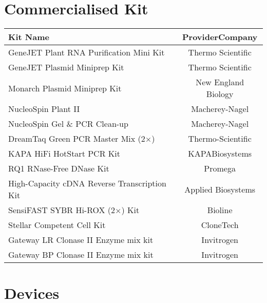 \section{Commercialised Kit}
\begin{longtable}[h]{|l|c|}
	\hline
	\textsf{\textbf{Kit Name}} & \textsf{\textbf{Provider\textfractionsolidus Company}} \\
	\hline
	GeneJET Plant RNA Purification Mini Kit & Thermo Scientific \\
	\hline
	GeneJET Plasmid Miniprep Kit & Thermo Scientific \\
	\hline
	Monarch Plasmid Miniprep Kit & New England Biology \\
	\hline
	NucleoSpin Plant II & Macherey-Nagel \\
	\hline
	NucleoSpin Gel \& PCR Clean-up & Macherey-Nagel \\
	\hline
	DreamTaq Green PCR Master Mix (2$\times$)  & Thermo-Scientific \\
	\hline
	KAPA HiFi HotStart PCR Kit & KAPABiosystems \\
	\hline
	RQ1 RNase-Free DNase Kit & Promega \\
	\hline
	High-Capacity cDNA Reverse Transcription Kit & Applied Biosystems \\
	\hline
	SensiFAST SYBR Hi-ROX (2$\times$) Kit & Bioline \\
	\hline
	Stellar Competent Cell Kit & CloneTech \\
	\hline
	Gateway LR Clonase II Enzyme mix kit & Invitrogen \\
	\hline
	Gateway BP Clonase II Enzyme mix kit & Invitrogen \\
	\hline
\end{longtable}
\section{Devices}

